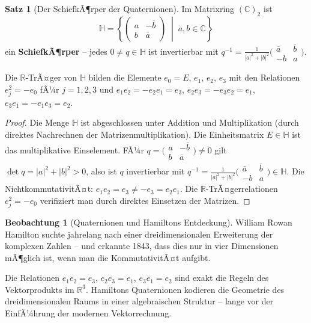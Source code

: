 ﻿\documentclass[a4paper,12pt]{report}
\theoremstyle{definition}
\newtheorem{satz}{Satz}
\newtheorem{beobachtung}{Beobachtung}
\begin{document}
\begin{satz}[Der SchiefkÃ¶rper der Quaternionen]
    Im Matrixring $(\mathbb{C})_2$ ist
    \[
        \mathbb{H} = \left\{ \begin{pmatrix} a & -\overline{b} \\ b & \overline{a} \end{pmatrix}
        \;\middle|\; a, b \in \mathbb{C} \right\}
    \]
    ein \textbf{SchiefkÃ¶rper} -- jedes $0 \neq q \in \mathbb{H}$ ist
    invertierbar mit $q^{-1} = \frac{1}{|a|^2+|b|^2}\bigl(\begin{smallmatrix}
    \overline{a} & \overline{b} \\ -b & a \end{smallmatrix}\bigr)$.

    Die $\mathbb{R}$-TrÃ¤ger von $\mathbb{H}$ bilden die Elemente
    $e_0 = E$, $e_1$, $e_2$, $e_3$ mit den Relationen
    $e_j^2 = -e_0$ fÃ¼r $j = 1,2,3$ und $e_1 e_2 = -e_2 e_1 = e_3$,
    $e_2 e_3 = -e_3 e_2 = e_1$, $e_3 e_1 = -e_1 e_3 = e_2$.
\end{satz}
\begin{proof}
    Die Menge $\mathbb{H}$ ist abgeschlossen unter Addition und Multiplikation
    (durch direktes Nachrechnen der Matrizenmultiplikation). Die Einheitsmatrix
    $E \in \mathbb{H}$ ist das multiplikative Einselement.
    FÃ¼r $q = \bigl(\begin{smallmatrix} a & -\bar{b} \\ b & \bar{a} \end{smallmatrix}\bigr)
    \neq 0$ gilt $\det q = |a|^2 + |b|^2 > 0$, also ist $q$ invertierbar
    mit $q^{-1} = \frac{1}{|a|^2+|b|^2}\bigl(\begin{smallmatrix}\bar{a} & \bar{b}
    \\ -b & a \end{smallmatrix}\bigr) \in \mathbb{H}$.
    Die NichtkommutativitÃ¤t: $e_1 e_2 = e_3 \neq -e_3 = e_2 e_1$.
    Die $\mathbb{R}$-TrÃ¤gerrelationen $e_j^2 = -e_0$ verifiziert man durch
    direktes Einsetzen der Matrizen.
\end{proof}


\begin{beobachtung}[Quaternionen und Hamiltons Entdeckung]
    William Rowan Hamilton suchte jahrelang nach einer dreidimensionalen
    Erweiterung der komplexen Zahlen -- und erkannte 1843, dass dies nur
    in vier Dimensionen mÃ¶glich ist, wenn man die KommutativitÃ¤t aufgibt.

    Die Relationen $e_1 e_2 = e_3$, $e_2 e_3 = e_1$, $e_3 e_1 = e_2$
    sind exakt die Regeln des Vektorprodukts im $\mathbb{R}^3$.
    Hamiltons Quaternionen kodieren die Geometrie des dreidimensionalen
    Raums in einer algebraischen Struktur -- lange vor der EinfÃ¼hrung
    der modernen Vektorrechnung.
\end{beobachtung}
\end{document}

